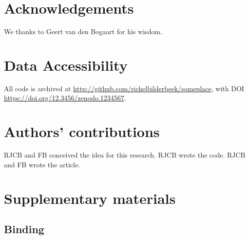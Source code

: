 \documentclass{article}
\begin{document}
\section{Acknowledgements}

We thanks to Geert van den Bogaart for his wisdom.

\section{Data Accessibility}

All code is archived at \url{http://github.com/richelbilderbeek/someplace},
with DOI \url{https://doi.org/12.3456/zenodo.1234567}.

\section{Authors' contributions}

RJCB and FB conceived the idea for this research. 
RJCB wrote the code.
RJCB and FB wrote the article.





\appendix
\section{Supplementary materials}

\subsection{Binding}


\end{document}
